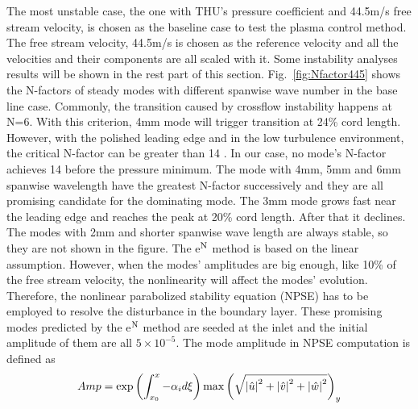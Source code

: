 \documentclass{AIAA}
\begin{document}
The most unstable case, the one with THU's pressure coefficient and 44.5m/s free stream velocity, is chosen as the baseline case to test the plasma control method. The free stream velocity, 44.5m/s is chosen as the reference velocity and all the velocities and their components are all scaled with it. Some instability analyses results will be shown in the rest part of this section. Fig.~\ref{fig:Nfactor445} shows the N-factors of steady modes with different spanwise wave number in the base line case. Commonly, the transition caused by crossflow instability happens at N=6. With this criterion, 4mm mode will trigger transition at 24\% cord length. However, with the polished leading edge and in the low turbulence environment, the critical N-factor can be greater than 14 \cite{saric2011}. In our case, no mode's N-factor achieves 14 before the pressure minimum. The mode with 4mm, 5mm and 6mm spanwise wavelength have the greatest N-factor successively and they are all promising candidate for the dominating mode. The 3mm mode grows fast near the leading edge and reaches the peak at 20\% cord length. After that it declines. The modes with 2mm and shorter spanwise wave length are always stable, so they are not shown in the figure. %
The e$^{\rm N}$ method is based on the linear assumption. However, when the modes' amplitudes are big enough, like 10\% of the free stream velocity, the nonlinearity will affect the modes' evolution. Therefore, the nonlinear parabolized stability equation (NPSE) has to be employed to resolve the disturbance in the boundary layer. These promising modes predicted by the e$^{\rm N}$ method are seeded at the inlet and the initial amplitude of them are all $5\times10^{-5}$. The mode amplitude in NPSE computation is defined as
\begin{equation}
Amp={\rm exp}\left(\int_{x_0}^x -\alpha _id\xi\right){\rm max} \left(\sqrt{\left| \hat{u} \right|^2+\left| \hat{v} \right|^2+\left| \hat{w} \right|^2}\right)_y
\end{equation}
\end{document}
